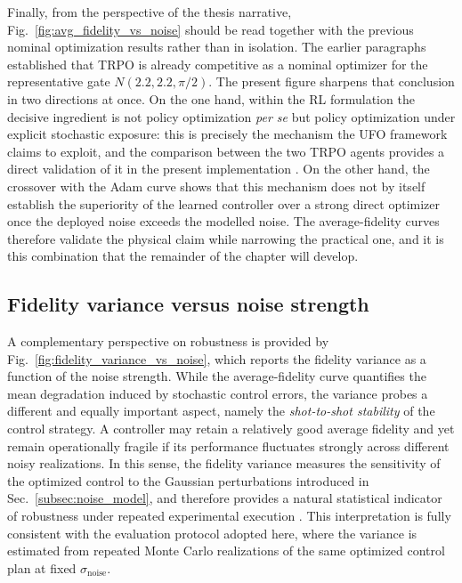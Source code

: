 Finally, from the perspective of the thesis narrative, Fig.~\ref{fig:avg_fidelity_vs_noise} should be read together
with the previous nominal optimization results rather than in isolation. The earlier paragraphs established that
TRPO is already competitive as a nominal optimizer for the representative gate $N(2.2,2.2,\pi/2)$. The present
figure sharpens that conclusion in two directions at once. On the one hand, within the RL formulation the decisive
ingredient is not policy optimization \emph{per se} but policy optimization under explicit stochastic exposure:
this is precisely the mechanism the UFO framework claims to exploit, and the comparison between the two TRPO
agents provides a direct validation of it in the present implementation \cite{Niu2019}. On the other hand, the
crossover with the Adam curve shows that this mechanism does not by itself establish the superiority of the
learned controller over a strong direct optimizer once the deployed noise exceeds the modelled noise. The
average-fidelity curves therefore validate the physical claim while narrowing the practical one, and it is this
combination that the remainder of the chapter will develop.



\subsection{Fidelity variance versus noise strength}
\label{subsec:fidelity_variance_vs_noise}

A complementary perspective on robustness is provided by Fig.~\ref{fig:fidelity_variance_vs_noise}, which reports the fidelity variance as a function of the noise strength. While the average-fidelity curve quantifies the mean degradation induced by stochastic control errors, the variance probes a different and equally important aspect, namely the \emph{shot-to-shot stability} of the control strategy. A controller may retain a relatively good average fidelity and yet remain operationally fragile if its performance fluctuates strongly across different noisy realizations. In this sense, the fidelity variance measures the sensitivity of the optimized control to the Gaussian perturbations introduced in Sec.~\ref{subsec:noise_model}, and therefore provides a natural statistical indicator of robustness under repeated experimental execution \cite{Niu2019}. This interpretation is fully consistent with the evaluation protocol adopted here, where the variance is estimated from repeated Monte Carlo realizations of the same optimized control plan at fixed \(\sigma_{\mathrm{noise}}\).

